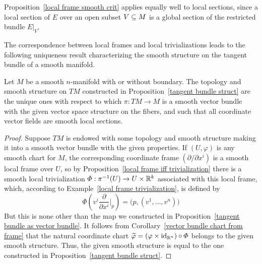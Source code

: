 Proposition~\ref{local frame smooth crit} applies equally well to local sections, since a local section of $E$ over an open subset $V\subseteq M$ is a global section of the restricted bundle $E|_V$.\par
The correspondence between local frames and local trivializations leads to the
following uniqueness result characterizing the smooth structure on the tangent bundle of a smooth manifold.
\begin{proposition}\label{tangent bundle struct unique}
Let $M$ be a smooth $n$-manifold with or without boundary. The topology and smooth structure on $TM$ constructed in Proposition~\ref{tangent bundle struct} are the 
unique ones with respect to which $\pi:TM\to M$ is a smooth vector bundle with the given vector space structure on the fibers, and such that all coordinate vector 
fields are smooth local sections.
\end{proposition}
\begin{proof}
Suppose $TM$ is endowed with some topology and smooth structure making it into a smooth vector bundle with the given properties. If $(U,\varphi)$ is any smooth chart for $M$, the corresponding coordinate frame $(\partial/\partial x^i)$ is a smooth local frame over $U$, so by Proposition~\ref{local frame iff trivialization} there is a smooth local trivialization $\varPhi:\pi^{-1}(U)\to U\times\mathbb{R}^k$ associated with this local frame, which, according to Example~\ref{local frame trivialization}, is defined by
\[\varPhi(v^i\frac{\partial}{\partial x^i}\Big|_p)=\big(p,(v^1,\dots,v^n)\big)\] But this is none other than the map we constructed in Proposition~\ref{tangent bundle as vector bundle}. It follows from Corollary~\ref{vector bundle chart from frame} that the natural coordinate chart $\widetilde{\varphi}=(\varphi\times\mathrm{id}_{\mathbb{R}^n})\circ\varPhi$ belongs to the given smooth structure. Thus, the given smooth structure is equal to the one constructed in Proposition~\ref{tangent bundle struct}.
\end{proof}
